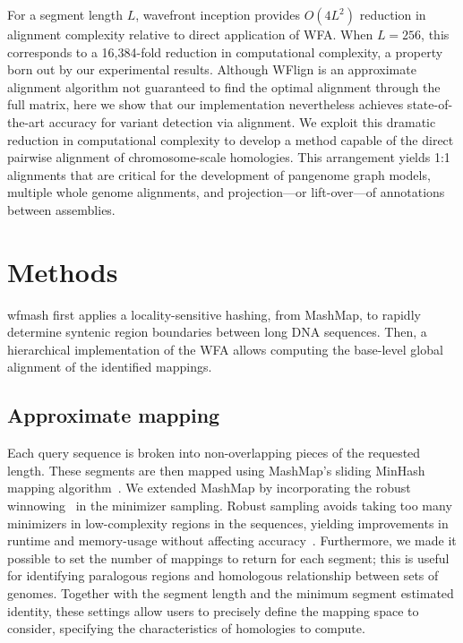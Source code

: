 \documentclass{bioinfo}
\theoremstyle{definition}
\begin{document}
For a segment length $L$, wavefront inception provides $O(4L^2)$ reduction in alignment complexity relative to direct application of WFA.
When $L=256$, this corresponds to a 16,384-fold reduction in computational complexity, a property born out by our experimental results.
Although WFlign is an approximate alignment algorithm not guaranteed to find the optimal alignment through the full matrix, here we show that our implementation nevertheless achieves state-of-the-art accuracy for variant detection via alignment.
We exploit this dramatic reduction in computational complexity to develop a method capable of the direct pairwise alignment of chromosome-scale homologies.
This arrangement yields 1:1 alignments that are critical for the development of pangenome graph models, multiple whole genome alignments, and projection---or lift-over---of annotations between assemblies.

%




\section{Methods}
\label{sec:methods}

wfmash first applies a locality-sensitive hashing, from MashMap, to rapidly determine syntenic region boundaries between long DNA sequences.
Then, a hierarchical implementation of the WFA allows computing the base-level global alignment of the identified mappings.

\subsection{Approximate mapping}
Each query sequence is broken into non-overlapping pieces of the requested length.
These segments are then mapped using MashMap's sliding MinHash mapping algorithm~\citep{Jain_2018}.
We extended MashMap by incorporating the robust winnowing~\citep{Schleimer2003} in the minimizer sampling.
Robust sampling avoids taking too many minimizers in low-complexity regions in the sequences, yielding improvements in runtime and memory-usage without affecting accuracy~\citep{Jain_2020}.
Furthermore, we made it possible to set the number of mappings to return for each segment; this is useful for identifying paralogous regions and homologous relationship between sets of genomes.
Together with the segment length and the minimum segment estimated identity, these settings allow users to precisely define the mapping space to consider, specifying the characteristics of homologies to compute.
\end{document}
